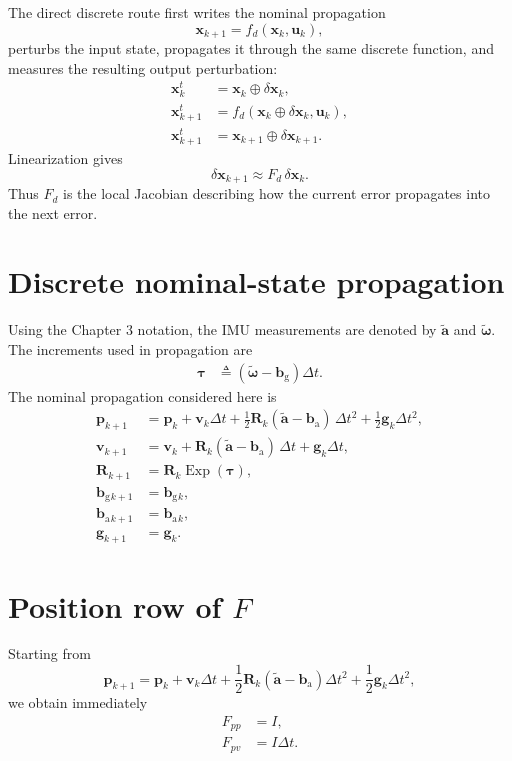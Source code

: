 \documentclass[11pt]{article}
\newcommand{\R}{\mathbf{R}}
\newcommand{\p}{\mathbf{p}}
\newcommand{\vct}{\mathbf{v}}
\newcommand{\bg}{\mathbf{b}_{\mathrm{g}}}
\newcommand{\ba}{\mathbf{b}_{\mathrm{a}}}
\newcommand{\g}{\mathbf{g}}
\newcommand{\Exp}{\operatorname{Exp}}
\newcommand{\atilde}{\tilde{\mathbf{a}}}
\newcommand{\omegatilde}{\tilde{\bm\omega}}
\begin{document}
The direct discrete route first writes the nominal propagation
\begin{equation}
\bm x_{k+1}=f_d(\bm x_k,\bm u_k),
\end{equation}
perturbs the input state, propagates it through the same discrete function, and measures the resulting output perturbation:
\begin{align}
\bm x_k^t &= \bm x_k\oplus\delta\bm x_k,\\
\bm x_{k+1}^t &= f_d(\bm x_k\oplus\delta\bm x_k,\bm u_k),\\
\bm x_{k+1}^t &= \bm x_{k+1}\oplus\delta\bm x_{k+1}.
\end{align}
Linearization gives
\begin{equation}
\delta\bm x_{k+1}\approx F_d\,\delta\bm x_k.
\end{equation}
Thus $F_d$ is the local Jacobian describing how the current error propagates into the next error.

\section{Discrete nominal-state propagation}
Using the Chapter 3 notation, the IMU measurements are denoted by
$\atilde$ and $\omegatilde$. The increments used in propagation are
\begin{align}
\bm\tau &\triangleq (\omegatilde-\bg)\Delta t.
\end{align}
The nominal propagation considered here is
\begin{align}
\p_{k+1}
&=\p_k+\vct_k\Delta t
+\frac12\R_k(\atilde-\ba)\,\Delta t^2
+\frac12\g_k\Delta t^2,\\
\vct_{k+1}
&=\vct_k+\R_k(\atilde-\ba)\,\Delta t+\g_k\Delta t,\\
\R_{k+1}
&=\R_k\Exp(\bm\tau),\\
\bg{}_{k+1}&=\bg{}_k,\\
\ba{}_{k+1}&=\ba{}_k,\\
\g_{k+1}&=\g_k.
\end{align}

\section{Position row of $F$}
Starting from
\begin{equation}
\p_{k+1}=\p_k+\vct_k\Delta t+\frac12\R_k(\atilde-\ba)\Delta t^2+\frac12\g_k\Delta t^2,
\end{equation}
we obtain immediately
\begin{align}
F_{pp}&=I,\\
F_{pv}&=I\Delta t.
\end{align}
\end{document}
